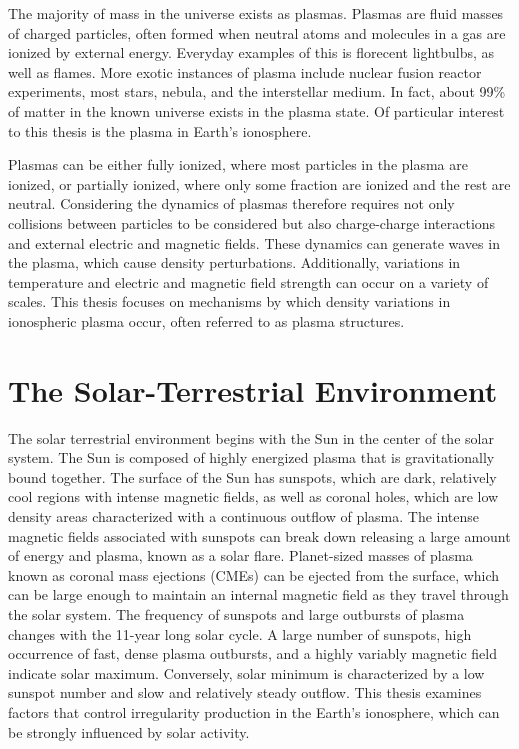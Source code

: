 \label{sec:introduction}

The majority of mass in the universe exists as plasmas.  Plasmas are fluid masses of charged particles, often formed when neutral atoms and molecules in a gas are ionized by external energy.  Everyday examples of this is florecent lightbulbs, as well as flames.  More exotic instances of plasma include nuclear fusion reactor experiments, most stars, nebula, and the interstellar medium.  In fact, about 99\% of matter in the known universe exists in the plasma state.  Of particular interest to this thesis is the plasma in Earth's ionosphere.

Plasmas can be either fully ionized, where most particles in the plasma are ionized, or partially ionized, where only some fraction are ionized and the rest are neutral.  Considering the dynamics of plasmas therefore requires not only collisions between particles to be considered but also charge-charge interactions and external electric and magnetic fields.  These dynamics can generate waves in the plasma, which cause density perturbations.  Additionally, variations in temperature and electric and magnetic field strength can occur on a variety of scales.  This thesis focuses on mechanisms by which density variations in ionospheric plasma occur, often referred to as plasma structures.

\section{The Solar-Terrestrial Environment}
The solar terrestrial environment begins with the Sun in the center of the solar system.  The Sun is composed of highly energized plasma that is gravitationally bound together.  The surface of the Sun has sunspots, which are dark, relatively cool regions with intense magnetic fields, as well as coronal holes, which are low density areas characterized with a continuous outflow of plasma.  The intense magnetic fields associated with sunspots can break down releasing a large amount of energy and plasma, known as a solar flare.  Planet-sized masses of plasma known as coronal mass ejections (CMEs) can be ejected from the surface, which can be large enough to maintain an internal magnetic field as they travel through the solar system.  The frequency of sunspots and large outbursts of plasma changes with the 11-year long solar cycle.  A large number of sunspots, high occurrence of fast, dense plasma outbursts, and a highly variably magnetic field indicate solar maximum.  Conversely, solar minimum is characterized by a low sunspot number and slow and relatively steady outflow.  This thesis examines factors that control irregularity production in the Earth's ionosphere, which can be strongly influenced by solar activity.

